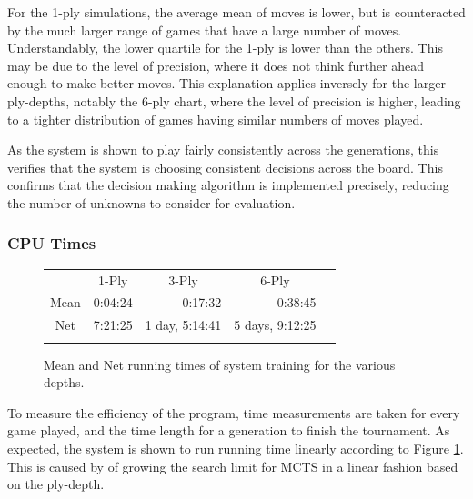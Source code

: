 \documentclass[12pt,a4paper]{article}
\begin{document}

            For the 1-ply simulations, the average mean of moves is lower, but is counteracted by the much larger range of games that have a large number of moves. Understandably, the lower quartile for the 1-ply is lower than the others. This may be due to the level of precision, where it does not think further ahead enough to make better moves. This explanation applies inversely for the larger ply-depths, notably the 6-ply chart, where the level of precision is higher, leading to a tighter distribution of games having similar numbers of moves played.

            As the system is shown to play fairly consistently across the generations, this verifies that the system is choosing consistent decisions across the board. This confirms that the decision making algorithm is implemented precisely, reducing the number of unknowns to consider for evaluation.

        \subsubsection{CPU Times}

        \begin{figure}[!ht]
            \centering
    
                \begin{tabular}{ccccc}
                       & 1-Ply        & 3-Ply          & 6-Ply          & \\ \cline{2-4}
                \multicolumn{1}{c|}{Mean} & \multicolumn{1}{r|}{0:04:24} & \multicolumn{1}{r|}{0:17:32}  & \multicolumn{1}{r|}{0:38:45}   & \\ \cline{2-4}
                \multicolumn{1}{c|}{Net} & \multicolumn{1}{r|}{7:21:25} & \multicolumn{1}{r|}{1 day, 5:14:41} & \multicolumn{1}{r|}{5 days, 9:12:25} & \\ \cline{2-4}
                       &          &           &            & 
                \end{tabular}
    
            \caption{Mean and Net running times of system training for the various depths. \label{cpu_table}}
            \end{figure}


            To measure the efficiency of the program, time measurements are taken for every game played, and the time length for a generation to finish the tournament. As expected, 
            the system is shown to run running time linearly according to Figure \ref{cpu_table}. This is caused by of growing the search limit for MCTS in a linear fashion based on the ply-depth.
\end{document}
